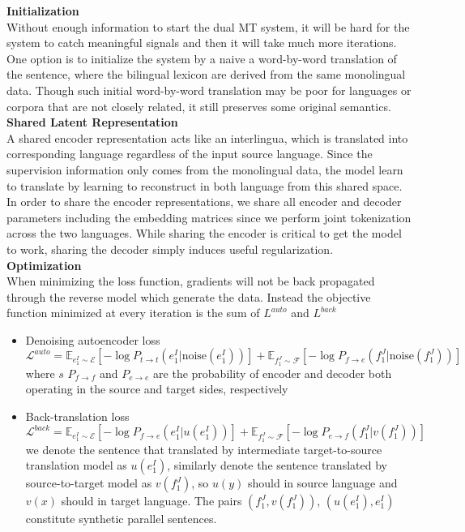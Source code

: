 \textbf{Initialization}\\
Without enough information to start the dual MT system, it will be hard for the system to catch meaningful signals and then it will take much more iterations. One option is to initialize the system by a naive a word-by-word translation of the sentence, where the bilingual lexicon are derived from the same monolingual data. Though such initial word-by-word translation may be poor for languages or corpora that are not closely related, it still preserves some  original semantics.\\


\textbf{Shared Latent Representation} \\
A shared encoder representation acts like an interlingua, which is translated into corresponding language regardless of the input source language. Since the  supervision information only comes from the monolingual data, the model learn to translate by learning to reconstruct in both language from this shared space.\\
In order to share the encoder representations, we share all encoder and decoder parameters including the embedding matrices since we perform joint tokenization across the two languages. While sharing the encoder is critical to get the model to work, sharing the decoder simply induces useful regularization.\\



\textbf{Optimization}\\
When minimizing the loss function, gradients will not be back propagated through the reverse model which generate the data. Instead the objective function minimized at every iteration is the sum of $L^{auto}$ and $L^{back}$
\begin{itemize}
	\item Denoising autoencoder loss
	\[ \mathcal{L}^{auto} = \mathbb{E}_{e_1^I \sim \mathcal{E}}[-\log P_{t\rightarrow t}(e_1^I|\text{noise}(e_1^I))] + \mathbb{E}_{f_1^J\sim \mathcal{F}} [-\log P_{f\rightarrow e}(f_1^J|\text{noise}(f_1^J))]\]
	where $s$ $P_{f\rightarrow f}$ and $P_{e\rightarrow e}$ are the probability of encoder and decoder both operating in the source and target sides, respectively
	\item Back-translation loss
	\[ \mathcal{L}^{back} = \mathbb{E}_{e_1^I\sim \mathcal{E}} [-\log P_{f\rightarrow e}(e_1^I|u(e_1^I))] +  \mathbb{E}_{f_1^J\sim \mathcal{F}} [-\log P_{e\rightarrow f}(f_1^J|v(f_1^J))]\]
	 we denote the sentence that translated by intermediate target-to-source translation model as $u(e_1^I)$, similarly denote the sentence translated by source-to-target model as $v(f_1^J)$, so $u(y)$ should in source language and $v(x)$ should in target language. The pairs $(f_1^J, v(f_1^J))$, $(u(e_1^I), e_1^I)$ constitute synthetic parallel  sentences.
\end{itemize}










